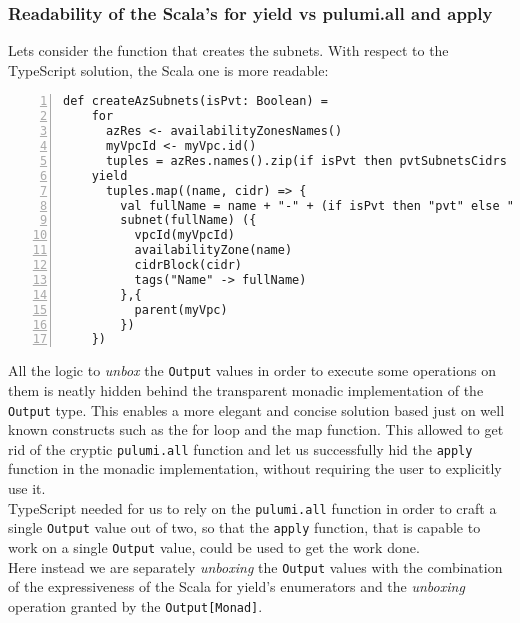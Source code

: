 \subsubsection{Readability of the Scala's for yield vs pulumi.all and apply}
\label{sssec:readability-for-yield}
Lets consider the function that creates the subnets.
With respect to the TypeScript solution, the Scala one is more readable:\\
\begin{minipage}{\linewidth}
  \begin{lstlisting}[numbers=left, numberstyle=\tiny, numbersep=-5pt, stepnumber=1]
  def createAzSubnets(isPvt: Boolean) =
    for
      azRes <- availabilityZonesNames()
      myVpcId <- myVpc.id()
      tuples = azRes.names().zip(if isPvt then pvtSubnetsCidrs else pubSubnetsCidrs)
    yield
      tuples.map((name, cidr) => {
        val fullName = name + "-" + (if isPvt then "pvt" else "pub") + "-subnet-scala"
        subnet(fullName) ({
          vpcId(myVpcId)
          availabilityZone(name)
          cidrBlock(cidr)
          tags("Name" -> fullName)
        },{
          parent(myVpc)
        })
    })
  \end{lstlisting}
\end{minipage}
All the logic to \textit{unbox} the \texttt{Output} values in order to execute some operations on them is neatly hidden behind the transparent monadic implementation of the \texttt{Output} type.
This enables a more elegant and concise solution based just on well known constructs such as the for loop and the map function.
This allowed to get rid of the cryptic \texttt{pulumi.all} function and let us successfully hid the \texttt{apply} function in the monadic implementation, without requiring the user to explicitly use it.\\
TypeScript needed for us to rely on the \texttt{pulumi.all} function in order to craft a single \texttt{Output} value out of two, so that the \texttt{apply} function, that is capable to work on a single \texttt{Output} value, could be used to get the work done.\\
Here instead we are separately \textit{unboxing} the \texttt{Output} values with the combination of the expressiveness of the Scala for yield's enumerators and the \textit{unboxing} operation granted by the \texttt{Output[Monad]}.\\
